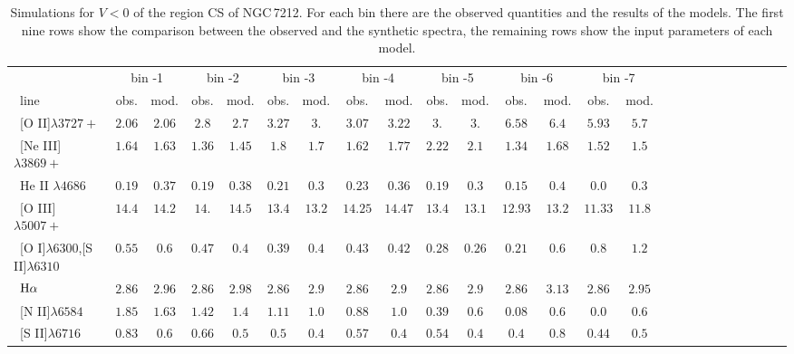 \documentclass[../thesis.tex]{subfiles}
\begin{document}
\begin{landscape}
\begin{table}

\centering
\caption{Simulations for $V<0$ of the region CS of NGC\,7212. For each bin there are the observed quantities and the results of the models. The first nine rows show the comparison between the observed and the synthetic spectra, the remaining rows show the input parameters of each model.}
\label{tab:sim_cs-N}


\small{
\begin{tabular}{lcccccccccccccccccccccccc}
\hline
\ &\multicolumn{2}{c}{bin -1}&\multicolumn{2}{c}{bin -2}&\multicolumn{2}{c}{bin -3}&\multicolumn{2}{c}{bin -4}&\multicolumn{2}{c}{bin -5}&\multicolumn{2}{c}{bin -6}&\multicolumn{2}{c}{bin -7}\\
\   line              &obs.  &mod. &obs.&mod.    &obs.  &mod. &obs.  &mod.   &obs.&mod.   & obs. &mod.   & obs.&mod. \\ \hline
\ [O II]$\lambda3727+$          &$2.06   $&$2.06  $&$2.8  $&$2.7   $&$3.27  $&$3.    $&$3.07  $&$3.22  $&$3.    $&$3.   $&$  6.58 $&$ 6.4  $&$ 5.93  $&$5.7  $ \\
\  [Ne III]$\lambda3869+$        &$1.64   $&$ 1.63 $&$1.36 $&$1.45  $&$1.8   $&$1.7   $&$1.62  $&$1.77  $&$2.22  $&$2.1  $&$ 1.34 $&$ 1.68  $&$ 1.52  $&$1.5       $        \\
\  He II $\lambda4686$           &$0.19   $&$ 0.37 $&$0.19 $&$0.38  $&$0.21  $&$0.3   $&$0.23  $&$0.36  $&$0.19  $&$0.3  $&$ 0.15 $&$ 0.4   $&$0.0    $&$0.3           $  \\
\  [O III]$\lambda5007+$         &$ 14.4  $&$ 14.2 $&$14.  $&$14.5  $&$13.4  $&$13.2  $&$14.25 $&$14.47 $&$13.4  $&$13.1 $&$ 12.93$&$13.2   $&$11.33  $&$11.8       $      \\
\ [O I]$\lambda6300$,[S II]$\lambda6310$ &$0.55   $&$0.6   $&$0.47 $&$0.4   $&$0.39  $&$0.4   $&$0.43  $&$0.42  $&$0.28  $&$0.26 $&$ 0.21 $&$ 0.6   $&$0.8    $&$1.2     $        \\
\ $\rm H\alpha$                 &$2.86   $&$ 2.96 $&$2.86 $&$2.98  $&$2.86  $&$2.9   $&$2.86  $&$2.9   $&$2.86  $&$2.9  $&$ 2.86 $&$ 3.13  $&$2.86   $&$2.95     $       \\
\  [N II]$\lambda6584$           &$1.85   $&$ 1.63 $&$1.42 $&$1.4   $&$1.11  $&$1.0   $&$0.88  $&$1.0   $&$0.39  $&$0.6  $&$ 0.08 $&$ 0.6   $&$0.0    $&$0.6         $    \\
\  [S II]$\lambda6716$           &$0.83   $&$ 0.6  $&$0.66 $&$0.5   $&$0.5   $&$0.4   $&$0.57  $&$0.4   $&$0.54  $&$0.4  $&$ 0.4 $&$ 0.8    $&$0.44   $&$0.5         $    \\

\end{tabular}}
\end{table}
\end{landscape}
\end{document}
